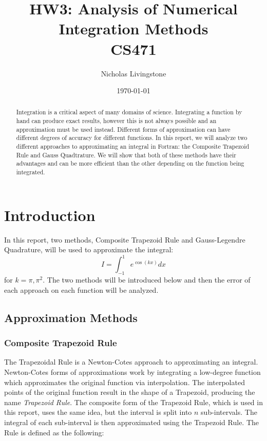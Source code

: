 \documentclass[12pt]{article}
\begin{document}
\title{HW3: Analysis of Numerical Integration Methods \\ CS471}
\author{Nicholas Livingstone}
\date{\today}
\maketitle

\begin{abstract}
Integration is a critical aspect of many domains of science. Integrating a function by hand can produce exact results,
however this is not always possible and an approximation must be used instead. Different forms of approximation can
have different degrees of accuracy for different functions. In this report, we will analyze two different approaches
to approximating an integral in Fortran: the Composite Trapezoid Rule and Gauss Quadtrature. We will show that both of these methods have 
their advantages and can be more efficient than the other depending on the function being integrated. 

\end{abstract}

\section{Introduction}

In this report, two methods, Composite Trapezoid Rule and Gauss-Legendre Quadrature, will be used to approximate the integral:
\[I =  \int_{-1}^1 e^{\cos{(k x)}} dx\]
for \(k = \pi, \pi^2\). The two methods will be introduced below and then the error of each approach on each function
will be analyzed. 


\subsection{Approximation Methods}
\subsubsection{Composite Trapezoid Rule}
The Trapezoidal Rule is a Newton-Cotes approach to approximating an integral. Newton-Cotes forms of approximations
work by integrating a low-degree function which approximates the original function via interpolation. The
interpolated points of the original function result in the shape of a Trapezoid, producing the name
\emph{Trapezoid Rule}. The composite form of the Trapezoid Rule, which is used in this report, uses the same
idea, but the interval is split into \(n\) sub-intervals. The integral of each sub-interval is then approximated
using the Trapezoid Rule. The Rule is defined as the following: \\
\end{document}
